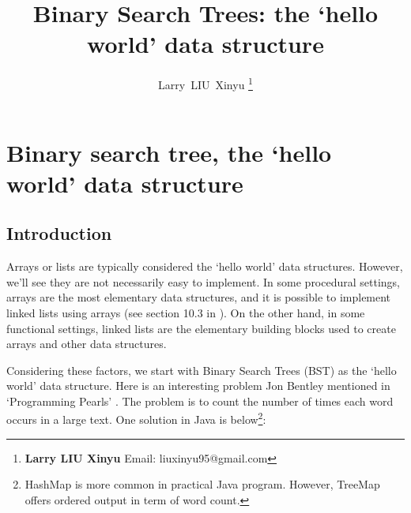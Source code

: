 \documentclass{article}
\begin{document}


\title{Binary Search Trees: the `hello world' data structure}

\author{Larry~LIU~Xinyu
\thanks{{\bfseries Larry LIU Xinyu } \newline
  Email: liuxinyu95@gmail.com \newline}
  }

\maketitle
\fi


\ifx\wholebook\relax
\chapter{Binary search tree, the `hello world' data structure}
\fi

\section{Introduction}
\label{introduction} 

Arrays or lists are typically considered the `hello world' data structures.
However, we'll see they are not necessarily easy to implement. In some procedural
settings, arrays are the most elementary data structures, and it is possible to implement
linked lists using arrays (see section 10.3 in \cite{CLRS}). On the other hand, in some functional settings,
linked lists are the elementary building blocks used to create arrays and other data structures.

Considering these factors, we start with Binary Search Trees (BST) as the `hello world'
data structure. Here is an interesting problem Jon Bentley mentioned in `Programming Pearls'
\cite{Bentley}. The problem is to count the number of times each word occurs
in a large text. One solution in Java is below\footnote{HashMap is more common in practical Java program. However, TreeMap offers ordered output in term of word count.}:
\end{document}
